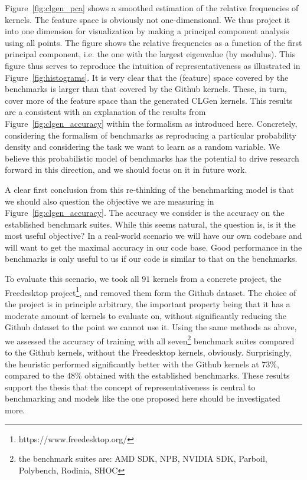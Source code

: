 Figure~\ref{fig:clgen_pca} shows a smoothed estimation of the relative frequencies of kernels. The feature space is obviously not one-dimensional. We thus project it into one dimension for visualization by making a principal component analysis using all points.
The figure shows the relative frequencies as a function of the first principal component, i.e. the one with the largest eigenvalue (by modulus). 
This figure thus serves to reproduce the intuition of representativeness as illustrated in Figure~\ref{fig:histograms}.
It is very clear that the (feature) space covered by the benchmarks is larger than that covered by the Github kernels. These, in turn, cover more of the feature space than the generated CLGen kernels.
This results are a consistent with an explanation of the results from Figure~\ref{fig:clgen_accuracy} within the formalism as introduced here.
Concretely, considering the formalism of benchmarks as reproducing a particular probability density and considering the task we want to learn as a random variable.
We believe this probabilistic model of benchmarks has the potential to drive research forward in this direction, and we should focus on it in future work.

A clear first conclusion from this re-thinking of the benchmarking model is that we should also question the objective we are measuring in Figure~\ref{fig:clgen_accuracy}.
The accuracy we consider is the accuracy on the established benchmark suites.
While this seems natural, the question is, is it the most useful objective?
In a real-world scenario we will have our own codebase and will want to get the maximal accuracy in our code base.
Good performance in the benchmarks is only useful to us if our code is similar to that on the benchmarks. 

To evaluate this scenario, we took all $91$ kernels from a concrete project, the Freedesktop project\footnote{https://www.freedesktop.org/}, and removed them form the Github dataset.
The choice of the project is in principle arbitrary, the important property being that it has a moderate amount of kernels to evaluate on, without significantly reducing the Github dataset to the point we cannot use it.
Using the same methods as above, we assessed the accuracy of training with all seven\footnote{the benchmark suites are: AMD SDK, NPB, NVIDIA SDK, Parboil, Polybench, Rodinia, SHOC} benchmark suites compared to the Github kernels, without the Freedesktop kernels, obviously.
Surprisingly, the heuristic performed significantly better with the Github kernels at $73\%$, compared to the $48\%$ obtained with the established benchmarks.
These results support the thesis that the concept of representativeness is central to benchmarking and models like the one proposed here should be investigated more.

